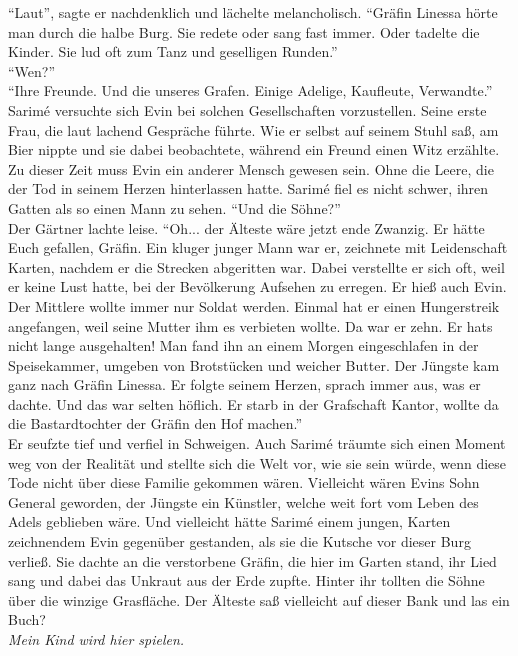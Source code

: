 ``Laut'', sagte er nachdenklich und lächelte melancholisch. ``Gräfin Linessa hörte man durch die 
halbe Burg. Sie redete oder sang fast immer. Oder tadelte die Kinder. Sie lud oft zum Tanz und 
geselligen Runden.''\\
``Wen?''\\
``Ihre Freunde. Und die unseres Grafen. Einige Adelige, Kaufleute, Verwandte.''\\
Sarimé versuchte sich Evin bei solchen Gesellschaften vorzustellen. Seine erste Frau, die laut 
lachend Gespräche führte. Wie er selbst auf seinem Stuhl saß, am Bier nippte und sie dabei 
beobachtete, während ein Freund einen Witz erzählte. Zu dieser Zeit muss Evin ein anderer Mensch 
gewesen sein. Ohne die Leere, die der Tod in seinem Herzen hinterlassen hatte. Sarimé fiel es nicht 
schwer, ihren Gatten als so einen Mann zu sehen. ``Und die Söhne?''\\
Der Gärtner lachte leise. ``Oh... der Älteste wäre jetzt ende Zwanzig. Er hätte Euch gefallen, 
Gräfin. Ein kluger junger Mann war er, zeichnete mit Leidenschaft Karten, nachdem er die Strecken 
abgeritten war. Dabei verstellte er sich oft, weil er keine Lust hatte, bei der Bevölkerung 
Aufsehen zu erregen. Er hieß auch Evin. Der Mittlere wollte immer nur Soldat werden. Einmal hat er 
einen Hungerstreik angefangen, weil seine Mutter ihm es verbieten wollte. Da war er zehn. Er hats 
nicht lange ausgehalten! Man fand ihn an einem Morgen eingeschlafen in der Speisekammer, umgeben 
von Brotstücken und weicher Butter. Der Jüngste kam ganz nach Gräfin Linessa. Er folgte seinem 
Herzen, sprach immer aus, was er dachte. Und das war selten höflich. Er starb in der Grafschaft 
Kantor, wollte da die Bastardtochter der Gräfin den Hof machen.''\\
Er seufzte tief und verfiel in Schweigen. Auch Sarimé träumte sich einen Moment weg von der 
Realität und stellte sich die Welt vor, wie sie sein würde, wenn diese Tode nicht über diese 
Familie gekommen wären. Vielleicht wären Evins Sohn General geworden, der Jüngste ein Künstler, 
welche weit fort vom Leben des Adels geblieben wäre. Und vielleicht hätte Sarimé einem jungen, 
Karten zeichnendem Evin gegenüber gestanden, als sie die Kutsche vor dieser Burg verließ. Sie 
dachte an die verstorbene Gräfin, die hier im Garten stand, ihr Lied sang und dabei das Unkraut aus 
der Erde zupfte. Hinter ihr tollten die Söhne über die winzige Grasfläche. Der Älteste saß 
vielleicht auf dieser Bank und las ein Buch?\\
\textit{Mein Kind wird hier spielen.}\\
